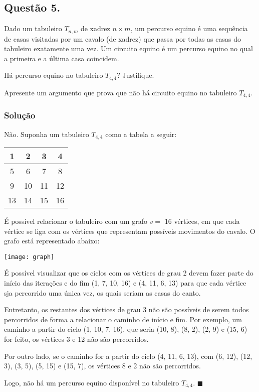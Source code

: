 \documentclass[12pt, letterpaper]{report}
\newcommand*{\CQD}{\hfill\ensuremath{\blacksquare}}%
\newcounter{ProblemNum}
\newcommand*{\anyproblem}[1]{\newpage\subsection*{#1}}
\newcommand*{\problem}[1]{\stepcounter{ProblemNum} %
   \anyproblem{Questão #1}}
\newcommand*{\soln}[1]{\subsubsection*{#1}}
\newcommand*{\solution}{\soln{Solução}}
\begin{document}
\problem{5.}
  Dado um tabuleiro $ T_{n,m} $ de xadrez $ n \times m $, um percurso equino é uma sequência de casas visitadas por um cavalo (de xadrez) que passa por todas as casas do tabuleiro exatamente uma vez. Um circuito equino é um percurso equino no qual a primeira e a última casa coincidem.

  Há percurso equino no tabuleiro $ T_{4,4} $? Justifique.

  Apresente um argumento que prova que não há circuito equino no tabuleiro $ T_{4,4} $.

\solution
  Não. Suponha um tabuleiro $T_{4, 4}$ como a tabela a seguir:

  \begin{center}
    \begin{tabular}{ | c | c | c | c | }
      \hline
      1 & 2 & 3 & 4 \\ \hline
      5 & 6 & 7 & 8 \\ \hline
      9 & 10 & 11 & 12 \\ \hline
      13 & 14 & 15 & 16 \\
      \hline
    \end{tabular}
  \end{center}

  É possível relacionar o tabuleiro com um grafo $v =$ 16 vértices, em que cada vértice se liga com os vértices que representam possíveis movimentos do cavalo. O grafo está representado abaixo:

  \begin{center}
    \texttt{[image: graph]}
  \end{center}

  É possível visualizar que os ciclos com os vértices de grau 2 devem fazer parte do início das iterações e do fim (1, 7, 10, 16) e (4, 11, 6, 13) para que cada vértice sja percorrido uma única vez, os quais seriam as casas do canto.

  Entretanto, os restantes dos vértices de grau 3 não são possíveis de serem todos percorridos de forma a relacionar o caminho de início e fim. Por exemplo, um caminho a partir do ciclo (1, 10, 7, 16), que seria (10, 8), (8, 2), (2, 9) e (15, 6) for feito, os vértices 3 e 12 não são percorridos.

  Por outro lado, se o caminho for a partir do ciclo (4, 11, 6, 13), com (6, 12), (12, 3), (3, 5), (5, 15) e (15, 7), os vértices 8 e 2 não são percorridos.

  Logo, não há um percurso equino disponível no tabuleiro $T_{4, 4}$.
  \CQD
\end{document}
